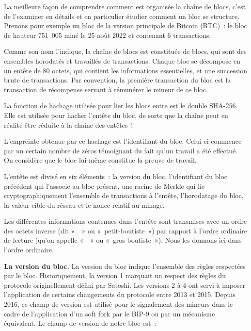 La meilleure façon de comprendre comment est organisée la chaîne de blocs, c'est de l'examiner en détails et en particulier étudier comment un bloc se structure. Prenons pour exemple un bloc de la version principale de Bitcoin (BTC)~: le bloc de hauteur 751~005 miné le 25 août 2022 et contenant 6 transactions.



Comme son nom l'indique, la chaîne de blocs est constituée de blocs, qui sont des ensembles horodatés et travaillés de transactions. Chaque bloc se décompose en un entête de 80 octets, qui contient les informations essentielles, et une succession brute de transactions. Par convention, la première transaction du bloc est la transaction de récompense servant à rémunérer le mineur de ce bloc.

La fonction de hachage utilisée pour lier les blocs entre est le double SHA-256. Elle est utilisée pour hacher l'entête du bloc, de sorte que la chaîne peut en réalité être réduite à la chaîne des entêtes~!

L'empreinte obtenue par ce hachage est l'identifiant du bloc. Celui-ci commence par un certain nombre de zéros témoignant du fait qu'un travail a été effectué. On considère que le bloc lui-même constitue la preuve de travail. %

L'entête est divisé en six éléments~: la version du bloc, l'identifiant du bloc précédent qui l'associe au bloc présent, une racine de Merkle qui lie cryptographiquement l'ensemble de transactions à l'entête, l'horodatage du bloc, la valeur cible du réseau et le nonce relatif au minage.

Les différentes informations contenues dans l'entête sont transmises avec un ordre des octets inverse (dit «~~» ou «~petit-boutiste~») par rapport à l'ordre ordinaire de lecture (qu'on appelle «~~» ou «~gros-boutiste~»). Nous les donnons ici dans l'ordre ordinaire.


\textbf{La version du bloc.} La version du bloc indique l'ensemble des règles respectées par le bloc. Historiquement, la version 1 marquait un respect des règles du protocole originellement défini par Satoshi. Les versions 2 à 4 ont servi à imposer l'application de certains changements du protocole entre 2013 et 2015. Depuis 2016, ce champ de version est utilisé pour le signalement des mineurs dans le cadre de l'application d'un soft fork par le BIP-9 ou par un mécanisme équivalent. Le champ de version de notre bloc est~:

